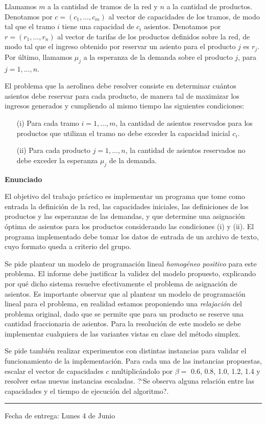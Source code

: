\documentclass[11pt, a4paper]{article}
\begin{document}
Llamamos $m$ a la cantidad de tramos de la red y $n$ a la cantidad de
productos. Denotamos por $c = (c_1, \dots, c_m)$ al vector de capacidades
de los tramos, de modo tal que el tramo $i$ tiene una capacidad de $c_i$
asientos. Denotamos por $r = (r_1,\dots,r_n)$ al vector de tarifas de los
productos definidos sobre la red, de modo tal que el ingreso obtenido por
reservar un asiento para el producto $j$ es $r_j$. Por \'ultimo,
llamamos $\mu_j$ a la esperanza de la demanda sobre el producto $j$,
para $j=1,\dots,n$.

El problema que la aerol\'{\i}nea debe resolver consiste en determinar
cu\'antos asientos debe reservar para cada producto, de manera tal de
maximizar los ingresos generados y cumpliendo al mismo tiempo las siguientes
condiciones:
\vspace*{-5mm}
\begin{itemize}
\item[(i)] Para cada tramo $i=1,\dots,m$, la cantidad de asientos
reservados para los productos que utilizan el tramo no debe exceder la
capacidad inicial $c_i$.

\item[(ii)] Para cada producto $j=1,\dots,n$, la cantidad de asientos
reservados no debe exceder la esperanza $\mu_j$ de la demanda.
\end{itemize}

\textbf{Enunciado}

El objetivo del trabajo pr\'actico es implementar un programa que tome como
entrada la definici\'on de la red, las capacidades iniciales, las
definiciones de los productos y las esperanzas de las demandas, y que
determine una asignaci\'on \'optima de asientos para los productos
considerando las condiciones (i) y (ii). El programa implementado debe tomar
los datos de entrada de un archivo de texto, cuyo formato queda a criterio
del grupo.

Se pide plantear un modelo de programaci\'on lineal \emph{homog\'eneo
positivo} para este problema. El informe debe justificar la validez del
modelo propuesto, explicando por qu\'e dicho sistema resuelve efectivamente
el problema de asignaci\'on de asientos. Es importante observar que al
plantear un modelo de programaci\'on lineal para el problema, en realidad
estamos proponiendo una \emph{relajaci\'on} del problema original, dado que
se permite que para un producto se reserve una cantidad fraccionaria de
asientos. Para la resoluci\'on de este modelo se debe implementar cualquiera
de las variantes vistas en clase del m\'etodo simplex.

Se pide tambi\'en realizar experimentos con distintas instancias para validar
el funcionamiento de la implementaci\'on. Para cada una de las instancias
propuestas, escalar el vector de capacidades $c$ multiplic\'andolo por
$\beta =$ 0.6, 0.8, 1.0, 1.2, 1.4 y resolver estas nuevas instancias
escaladas. ?`Se observa alguna relaci\'on entre las capacidades y el
tiempo de ejecuci\'on del algoritmo?.

\vskip 15pt

\hrule

\vskip 11pt

Fecha de entrega: Lunes 4 de Junio
\end{document}

